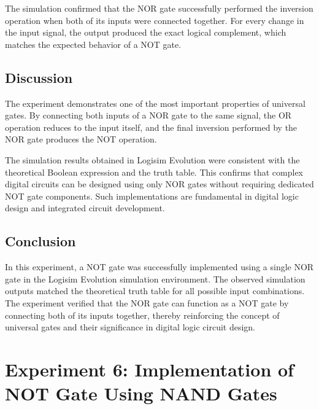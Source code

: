\documentclass[12pt,a4paper]{article}
\begin{document}
The simulation confirmed that the NOR gate successfully performed the inversion operation when both of its inputs were connected together. For every change in the input signal, the output produced the exact logical complement, which matches the expected behavior of a NOT gate.


\subsection{Discussion}

The experiment demonstrates one of the most important properties of universal gates. By connecting both inputs of a NOR gate to the same signal, the OR operation reduces to the input itself, and the final inversion performed by the NOR gate produces the NOT operation.

The simulation results obtained in Logisim Evolution were consistent with the theoretical Boolean expression and the truth table. This confirms that complex digital circuits can be designed using only NOR gates without requiring dedicated NOT gate components. Such implementations are fundamental in digital logic design and integrated circuit development.


\subsection{Conclusion}

In this experiment, a NOT gate was successfully implemented using a single NOR gate in the Logisim Evolution simulation environment. The observed simulation outputs matched the theoretical truth table for all possible input combinations. The experiment verified that the NOR gate can function as a NOT gate by connecting both of its inputs together, thereby reinforcing the concept of universal gates and their significance in digital logic circuit design.


\section{Experiment 6: Implementation of NOT Gate Using NAND Gates}
\end{document}
